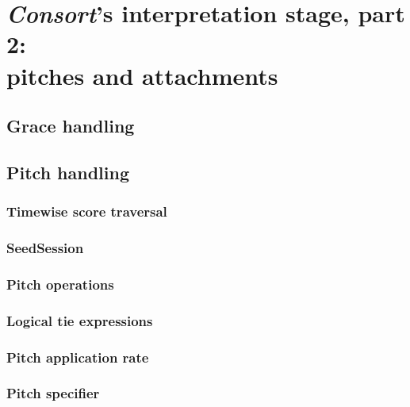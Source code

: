 \chapter[\emph{Consort}'s interpretation stage, part 2: pitches and attachments]{
    \emph{Consort}'s interpretation stage, part 2:\\ pitches and attachments}

\section{Grace handling}

\section{Pitch handling}

\subsection{Timewise score traversal}

\subsection{SeedSession}

\subsection{Pitch operations}

\subsection{Logical tie expressions}

\subsection{Pitch application rate}

\subsection{Pitch specifier}

